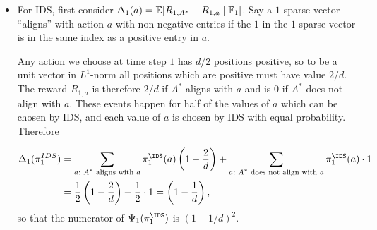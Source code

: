 \documentclass[11pt, openany]{book}
\begin{document}
\begin{example}
\begin{itemize}
\begin{itemize}
        \item For IDS, first consider $\Delta_1(a) = \mathbb{E}[R_{1,A^*} - R_{1,a}\mid\mathbb{F}_1]$. Say a $1$-sparse vector ``aligns'' with action $a$ with non-negative entries if the $1$ in the $1$-sparse vector is in the same index as a positive entry in $a$.

            Any action we choose at time step $1$ has $d/2$ positions positive, so to be a unit vector in $L^1$-norm all positions which are positive must have value $2/d$. The reward $R_{1,a}$ is therefore $2/d$ if $A^*$ aligns with $a$ and is $0$ if $A^*$ does not align with $a$. These events happen for half of the values of $a$ which can be chosen by IDS, and each value of $a$ is chosen by IDS with equal probability. Therefore

            \begin{align*}
                \Delta_1(\pi_1^{IDS}) & = \sum_{a:\text{ $A^*$ aligns with $a$}} \pi_1^{\IDS}(a) \left(1-\frac{2}{d}\right) + \sum_{a:\text{ $A^*$ does not align with $a$}} \pi_1^{\IDS}(a) \cdot 1 \\
                                      & = \frac{1}{2} \left(1-\frac{2}{d}\right) + \frac{1}{2} \cdot 1  = \left(1 - \frac{1}{d}\right),
            \end{align*}
            so that the numerator of $\Psi_1(\pi_1^{\IDS})$ is $(1-1/d)^2$.


\end{itemize}
\end{itemize}
\end{example}
\end{document}
